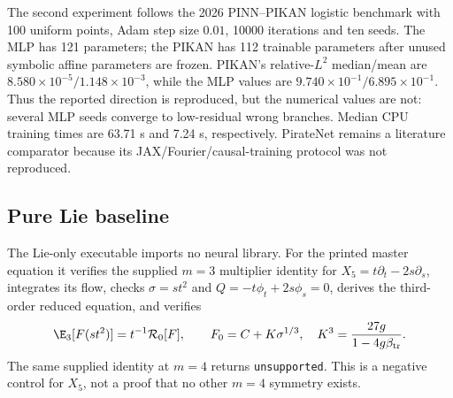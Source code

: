 The second experiment follows the 2026 PINN--PIKAN logistic benchmark
\cite{pikan} with 100 uniform points, Adam step size $0.01$, 10000 iterations
and ten seeds. The MLP has 121 parameters; the PIKAN has 112 trainable
parameters after unused symbolic affine parameters are frozen. PIKAN's
relative-$L^2$ median/mean are $8.580\times10^{-5}/1.148\times10^{-3}$, while the
MLP values are $9.740\times10^{-1}/6.895\times10^{-1}$. Thus the reported direction
is reproduced, but the numerical values are not: several MLP seeds converge
to low-residual wrong branches. Median CPU training times are 63.71 s and
7.24 s, respectively. PirateNet \cite{piratenet} remains a literature
comparator because its JAX/Fourier/causal-training protocol was not reproduced.

\subsection{Pure Lie baseline}
The Lie-only executable imports no neural library. For the printed master
equation it verifies the supplied $m=3$ multiplier identity for
$X_5=t\partial_t-2s\partial_s$, integrates its flow, checks
$\sigma=st^2$ and $Q=-t\phi_t+2s\phi_s=0$, derives the third-order reduced
equation, and verifies
\[
 \E_3[F(st^2)]=t^{-1}\mathcal R_0[F],\qquad
 F_0=C+K\sigma^{1/3},\quad
 K^3=\frac{27g}{1-4g\beta_{\rm tr}}.
\]
The same supplied identity at $m=4$ returns \texttt{unsupported}. This is a
negative control for $X_5$, not a proof that no other $m=4$ symmetry exists.

